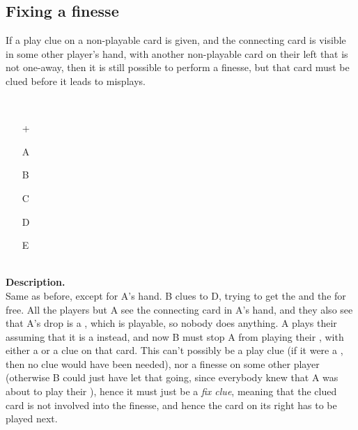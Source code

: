 \subsection{Fixing a finesse}

\begin{convention}
	\label{unfinessing}
	If a play clue on a non-playable card is given, and the connecting card is visible in some other player's hand, with another non-playable card on their left that is not one-away, then it is still possible to perform a finesse, but that card must be clued before it leads to misplays.
\end{convention}

\begin{example}	\hfill \\
	\begin{minipage}{0.45\textwidth}
		\begin{itemize}
			\item[\Large +]      
			\item[\Large A]    
			\item[\Large B]    
			\item[\Large C]     
			\item[\Large D]    
			\item[\Large E]    
		\end{itemize}
	\end{minipage}%
	\begin{minipage}{0.55\textwidth}
		\hfill \\
		
		\textbf{Description.} \\
		
		Same as before, except for A's hand. B clues  to D, trying to get the  and the  for free. All the players but A see the connecting card in A's hand, and they also see that A's drop is a , which is playable, so nobody does anything. A plays their  assuming that it is a  instead, and now B must stop A from playing their , with either a  or a  clue on that card. This can't possibly be a play clue (if it were a , then no clue would have been needed), nor a finesse on some other player (otherwise B could just have let that going, since everybody knew that A was about to play their ), hence it must just be a \emph{fix clue}, meaning that the clued card is not involved into the finesse, and hence the card on its right has to be played next.
	\end{minipage}
\end{example} \vspace{0.15 cm}

